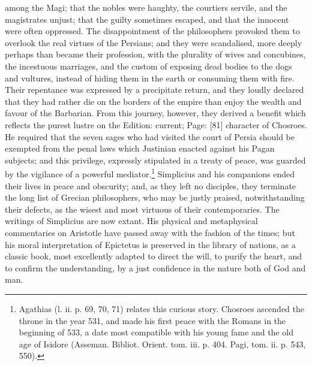 among the Magi; that the nobles were haughty, the courtiers servile, and the magistrates unjust; that the guilty sometimes escaped, and that the innocent were often oppressed. The disappointment of the philosophers provoked them to overlook the real virtues of the Persians; and they were scandalised, more deeply perhaps than became their profession, with the plurality of wives and concubines, the incestuous marriages, and the custom of exposing dead bodies to the dogs and vultures, instead of hiding them in the earth or consuming them with fire. Their repentance was expressed by a precipitate return, and they loudly declared that they had rather die on the borders of the empire than enjoy the wealth and favour of the Barbarian. From this journey, however, they derived a benefit which reflects the purest lustre on the Edition: current; Page: [81] character of Chosroes. He required that the seven sages who had visited the court of Persia should be exempted from the penal laws which Justinian enacted against his Pagan subjects; and this privilege, expressly stipulated in a treaty of peace, was guarded by the vigilance of a powerful mediator.\footnote{Agathias (l. ii. p. 69, 70, 71) relates this curious story. Chosroes ascended the throne in the year 531, and made his first peace with the Romans in the beginning of 533, a date most compatible with his young fame and the old age of Isidore (Asseman. Bibliot. Orient. tom. iii. p. 404. Pagi, tom. ii. p. 543, 550).} Simplicius and his companions ended their lives in peace and obscurity; and, as they left no disciples, they terminate the long list of Grecian philosophers, who may be justly praised, notwithstanding their defects, as the wisest and most virtuous of their contemporaries. The writings of Simplicius are now extant. His physical and metaphysical commentaries on Aristotle have passed away with the fashion of the times; but his moral interpretation of Epictetus is preserved in the library of nations, as a classic book, most excellently adapted to direct the will, to purify the heart, and to confirm the understanding, by a just confidence in the nature both of God and man.

